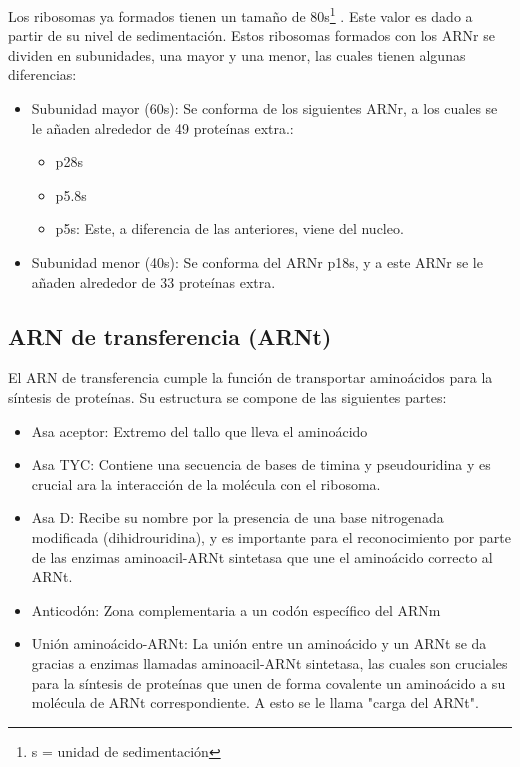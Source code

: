 Los ribosomas ya formados tienen un tamaño de 80s\footnote{s = unidad de sedimentación} . Este valor es dado a partir de su nivel de sedimentación.
Estos ribosomas formados con los ARNr se dividen en subunidades, una mayor y una menor, las cuales tienen algunas diferencias:

\begin{itemize}
    \item Subunidad mayor (60s): Se conforma de los siguientes ARNr, a los cuales se le añaden alrededor de 49 proteínas extra.:
        \begin{itemize}
            \item p28s
            \item p5.8s
            \item p5s: Este, a diferencia de las anteriores, viene del nucleo. 
        \end{itemize} 
        
    \item Subunidad menor (40s): Se conforma del ARNr p18s, y a este ARNr se le añaden alrededor de 33 proteínas extra.
\end{itemize}

\subsection{ARN de transferencia (ARNt)}

El ARN de transferencia cumple la función de transportar aminoácidos para la síntesis de proteínas. Su estructura se compone de las siguientes partes:

\begin{itemize}
    \item Asa aceptor: Extremo del tallo que lleva el aminoácido 
    \item Asa TYC: Contiene una secuencia de bases de timina y pseudouridina y es crucial ara la interacción de la molécula con el ribosoma.
    \item Asa D: Recibe su nombre por la presencia de una base nitrogenada modificada (dihidrouridina), y es importante para el reconocimiento por parte de las enzimas aminoacil-ARNt sintetasa que une el aminoácido correcto al ARNt.
    \item Anticodón: Zona complementaria a un codón específico del ARNm
    \item Unión aminoácido-ARNt: La unión entre un aminoácido y un ARNt se da gracias a enzimas llamadas aminoacil-ARNt sintetasa, las cuales son cruciales para la síntesis de proteínas que unen de forma covalente un aminoácido a su molécula de ARNt correspondiente. A esto se le llama "carga del ARNt".
\end{itemize}

